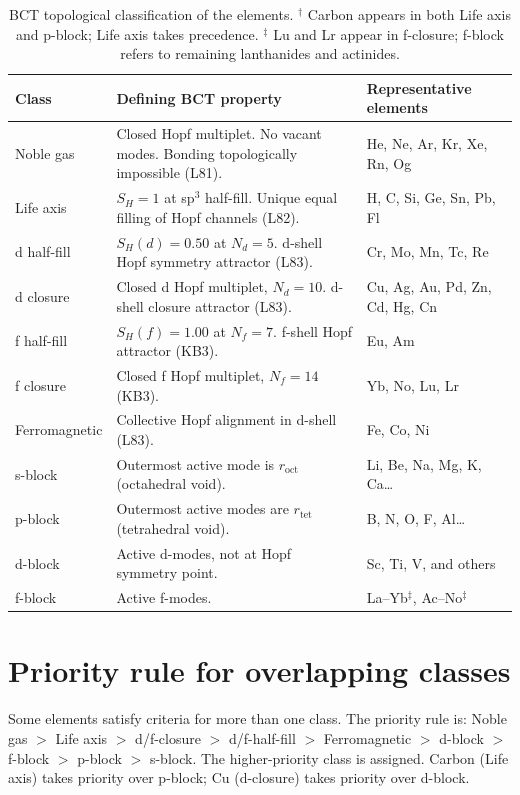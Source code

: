 \documentclass[aps,prl,onecolumn,superscriptaddress]{revtex4-2}
\begin{document}
\begin{table}[h]
\centering
\caption{BCT topological classification of the elements.
$^\dagger$ Carbon appears in both Life axis and p-block;
Life axis takes precedence.
$^\ddagger$ Lu and Lr appear in f-closure; f-block
refers to remaining lanthanides and actinides.}
\begin{tabular}{p{26mm}p{58mm}p{50mm}}
\toprule
Class & Defining BCT property & Representative elements \\
\midrule
Noble gas    & Closed Hopf multiplet. No vacant modes. Bonding topologically impossible (L81). & He, Ne, Ar, Kr, Xe, Rn, Og \\[4pt]
Life axis    & $S_H = 1$ at sp$^3$ half-fill. Unique equal filling of Hopf channels (L82). & H, C, Si, Ge, Sn, Pb, Fl \\[4pt]
d half-fill  & $S_H(d) = 0.50$ at $N_d = 5$. d-shell Hopf symmetry attractor (L83). & Cr, Mo, Mn, Tc, Re \\[4pt]
d closure    & Closed d Hopf multiplet, $N_d = 10$. d-shell closure attractor (L83). & Cu, Ag, Au, Pd, Zn, Cd, Hg, Cn \\[4pt]
f half-fill  & $S_H(f) = 1.00$ at $N_f = 7$. f-shell Hopf attractor (KB3). & Eu, Am \\[4pt]
f closure    & Closed f Hopf multiplet, $N_f = 14$ (KB3). & Yb, No, Lu, Lr \\[4pt]
Ferromagnetic & Collective Hopf alignment in d-shell (L83). & Fe, Co, Ni \\[4pt]
s-block      & Outermost active mode is $r_\mathrm{oct}$ (octahedral void). & Li, Be, Na, Mg, K, Ca\ldots \\[4pt]
p-block      & Outermost active modes are $r_\mathrm{tet}$ (tetrahedral void). & B, N, O, F, Al\ldots \\[4pt]
d-block      & Active d-modes, not at Hopf symmetry point. & Sc, Ti, V, and others \\[4pt]
f-block      & Active f-modes. & La--Yb$^\ddagger$, Ac--No$^\ddagger$ \\
\bottomrule
\end{tabular}
\end{table}

\section{Priority rule for overlapping classes}

Some elements satisfy criteria for more than one class.
The priority rule is: Noble gas $>$ Life axis $>$ d/f-closure
$>$ d/f-half-fill $>$ Ferromagnetic $>$ d-block $>$ f-block
$>$ p-block $>$ s-block. The higher-priority class is assigned.
Carbon (Life axis) takes priority over p-block; Cu (d-closure)
takes priority over d-block.
\end{document}
